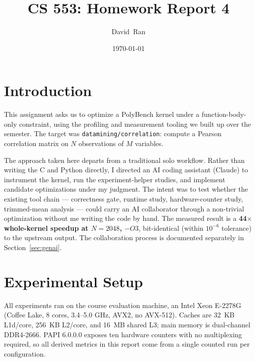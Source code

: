 \documentclass[11pt]{article}
\def \fnamea{David}
\def \lnamea{Ran}
\def \class{CS 553}
\def \hwnum{4} %
\def \assgn{Homework Report \hwnum}
\begin{document}
\title{\class: \assgn}
\author{\fnamea\ \lnamea}
\date{\today}
\maketitle
\tableofcontents




\newpage
\section{Introduction}

This assignment asks us to optimize a PolyBench kernel under a function-body-only constraint, using the profiling and measurement tooling we built up over the semester. The target was \texttt{datamining/correlation}: compute a Pearson correlation matrix on $N$ observations of $M$ variables.

The approach taken here departs from a traditional solo workflow. Rather than writing the C and Python directly, I directed an AI coding assistant (Claude) to instrument the kernel, run the experiment-helper studies, and implement candidate optimizations under my judgment. The intent was to test whether the existing tool chain --- correctness gate, runtime study, hardware-counter study, trimmed-mean analysis --- could carry an AI collaborator through a non-trivial optimization without me writing the code by hand. The measured result is a \textbf{44$\times$ whole-kernel speedup at $N{=}2048$, $-O3$}, bit-identical (within $10^{-6}$ tolerance) to the upstream output. The collaboration process is documented separately in Section~\ref{sec:genai}.


\section{Experimental Setup}

All experiments ran on the course evaluation machine, an Intel Xeon E-2278G (Coffee Lake, 8 cores, 3.4--5.0 GHz, AVX2, no AVX-512). Caches are 32~KB L1d/core, 256~KB L2/core, and 16~MB shared L3; main memory is dual-channel DDR4-2666. PAPI 6.0.0.0 exposes ten hardware counters with no multiplexing required, so all derived metrics in this report come from a single counted run per configuration.
\end{document}
